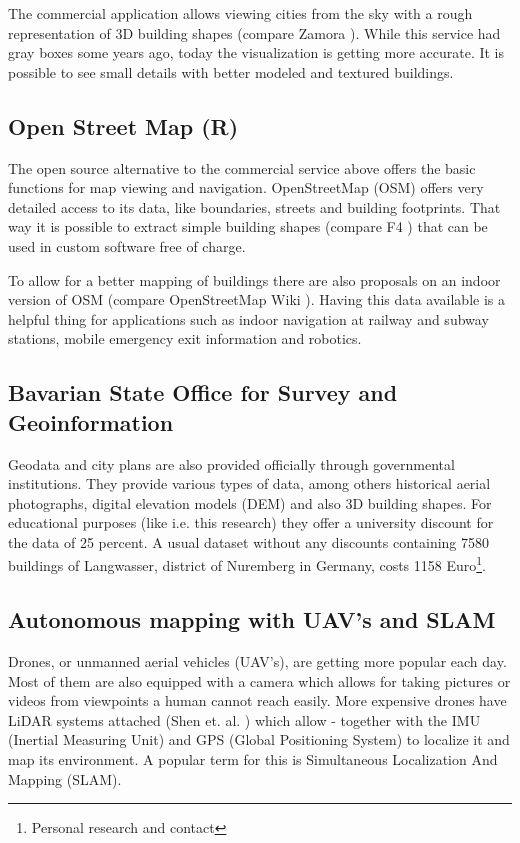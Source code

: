 The commercial application allows viewing cities from the sky with a rough representation of 3D building shapes (compare Zamora \parencite{google_maps}). While this service had gray boxes some years ago, today the visualization is getting more accurate. It is possible to see small details with better modeled and textured buildings.

\subsection{Open Street Map (R) }

The open source alternative to the commercial service above offers the basic functions for map viewing and navigation. OpenStreetMap (OSM) offers very detailed access to its data, like boundaries, streets and building footprints. That way it is possible to extract simple building shapes (compare F4 \parencite{f4map}) that can be used in custom software free of charge.

To allow for a better mapping of buildings there are also proposals on an indoor version of OSM (compare OpenStreetMap Wiki \parencite{openstreetmap_wiki}). Having this data available is a helpful thing for applications such as indoor navigation at railway and subway stations, mobile emergency exit information and robotics.

\subsection{Bavarian State Office for Survey and Geoinformation}

Geodata and city plans are also provided officially through governmental institutions. They provide various types of data, among others historical aerial photographs, digital elevation models (DEM) and also 3D building shapes. For educational purposes (like i.e. this research) they offer a university discount for the data of 25 percent. A usual dataset without any discounts containing 7580 buildings of Langwasser, district of Nuremberg in Germany, costs 1158 Euro\footnote{Personal research and contact}.

\subsection{Autonomous mapping with UAV's and SLAM}

Drones, or unmanned aerial vehicles (UAV's), are getting more popular each day. Most of them are also equipped with a camera which allows for taking pictures or videos from viewpoints a human cannot reach easily. More expensive drones have LiDAR systems attached (Shen et. al. \parencite{drones_lidar}) which allow - together with the IMU (Inertial Measuring Unit) and GPS (Global Positioning System) to localize it and map its environment. A popular term for this is Simultaneous Localization And Mapping (SLAM).

